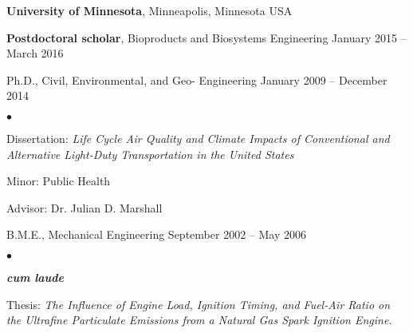 \documentclass[margin,line,10pt]{res}
\newenvironment{list1}{
  \begin{list}{\ding{113}}{%
      \setlength{\itemsep}{0in}
      \setlength{\parsep}{0in} \setlength{\parskip}{0in}
      \setlength{\topsep}{0in} \setlength{\partopsep}{0in} 
      \setlength{\leftmargin}{0.17in}}}{\end{list}}
\newenvironment{list2}{
  \begin{list}{$\bullet$}{%
      \setlength{\itemsep}{0in}
      \setlength{\parsep}{0in} \setlength{\parskip}{0in}
      \setlength{\topsep}{0in} \setlength{\partopsep}{0in} 
      \setlength{\leftmargin}{0.2in}}}{\end{list}}
\begin{document}
\begin{resume}
\textbf{University of Minnesota}, Minneapolis, Minnesota USA\\

\vspace*{-.1in}

\begin{list1}
\item[] \textbf{Postdoctoral scholar}, Bioproducts and Biosystems Engineering \hfill January 2015 -- March 2016\\

\vspace*{-.1in}

\item[] Ph.D., Civil, Environmental, and Geo- Engineering \hfill January 2009 -- December 2014\\
\begin{list2}
\vspace*{-.12in}
\item Dissertation: \textit{Life Cycle Air Quality and Climate Impacts of Conventional and Alternative Light-Duty Transportation in the United States}
\item Minor: Public Health
\item Advisor:  Dr. Julian D. Marshall
\end{list2}

\vspace*{.05in}

\item[] B.M.E., Mechanical Engineering \hfill September 2002 -- May 2006\\
\vspace*{-.12in}
\begin{list2}
\item {\bf {\em cum laude}}
\item Thesis: \textit{The Influence of Engine Load, Ignition Timing, and Fuel-Air Ratio on the Ultrafine Particulate Emissions from a Natural Gas Spark Ignition Engine.}
\end{list2}
\end{list1}






\end{resume}
\end{document}
